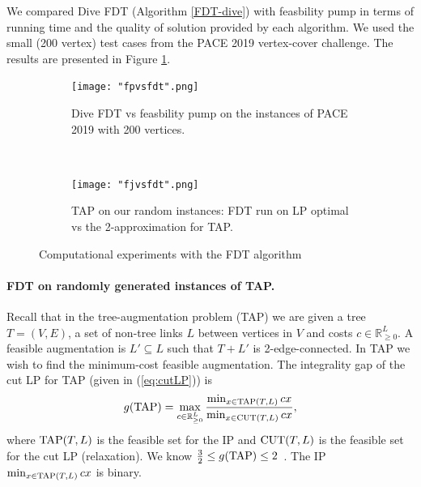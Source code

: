 We compared Dive FDT (Algorithm \ref{FDT-dive}) with feasbility pump \cite{fp1} in terms of running time
and the quality of solution provided by each algorithm. We used the small (200 vertex) test cases from the PACE 2019 vertex-cover challenge. The results are presented in Figure \ref{fpvsfdt}. 

\begin{figure}[h!]
\begin{subfigure}{.5\textwidth}
\centering
	\texttt{[image: "fpvsfdt".png]}
	\caption{Dive FDT vs feasbility pump on the instances of PACE 2019 \cite{PACE} with 200 vertices.}
	\label{fpvsfdt}
	\end{subfigure}
	$\quad\;$
	\begin{subfigure}{.5\textwidth}
	\centering
	\texttt{[image: "fjvsfdt".png]}
	\caption{TAP on our random instances: FDT run on LP optimal vs the 2-approximation for TAP\cite{FJ81}.}
	\label{fjvsfdt}
	\end{subfigure}
	\caption{Computational experiments with the FDT algorithm}
	\label{fdtcomp}
\end{figure}
\paragraph{FDT on randomly generated instances of TAP.}
Recall that in the tree-augmentation problem (TAP) we are given a tree $T=(V,E)$, a set of non-tree links $L$ between vertices in $V$ and costs $c\in \mathbb{R}^{L}_{\geq 0}$. A feasible augmentation is $L'\subseteq L$ such that $T+L'$ is 2-edge-connected. In TAP we wish to find the minimum-cost feasible augmentation. The integrality gap of the cut LP for TAP (given in (\ref{eq:cutLP})) is
\begin{equation*}
g(\operatorname{{{TAP}}}) = \max_{c\in \mathbb{R}^L_{\geq 0}} \frac{\min_{x\in\operatorname{{{TAP}}}(T,L)} cx}{\min_{x\in\operatorname{{{CUT}}}(T,L)} cx},
\end{equation*}  
where $\operatorname{{{TAP}}}(T,L)$ is the feasible set for the IP and $\operatorname{{{CUT}}}(T,L)$ is the feasible set for the cut LP (relaxation).
We know $\frac{3}{2}\leq g(\operatorname{{{TAP}}})\leq 2$~\cite{FJ81,32gaptap}. The IP $\min_{x\in \operatorname{{{TAP}}}(T,L)}cx$ is binary. 

